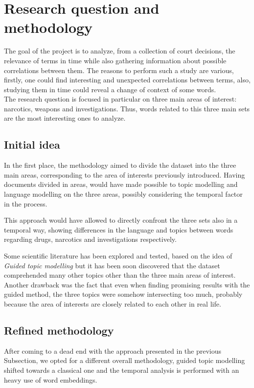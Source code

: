 \section{Research question and methodology}

The goal of the project is to analyze, from a collection 
of court decisions, the relevance of terms in time while 
also gathering information about possible correlations between 
them. The reasons to perform such a study are various, firstly, 
one could find interesting and unexpected correlations between terms, 
also, studying them in time could reveal a change of 
context of some words.\\
The research question is focused in particular on three main areas of interest:
narcotics, weapons and investigations. Thus, words related to this three main sets
are the most interesting ones to analyze.

\subsection{Initial idea}
\label{res-med}
In the first place, the methodology aimed to divide the dataset into the three main areas, 
corresponding to the area of interests previously introduced. 
Having documents divided in areas, would have made possible to topic modelling and language modelling on the three areas, possibly considering the temporal factor in the process. 

This approach would have allowed to directly confront the three sets also in a temporal way, showing differences in the language and topics between words regarding drugs, narcotics and investigations respectively.

Some scientific literature has been explored and tested, based on the idea of \emph{Guided topic modelling} 
but it has been soon discovered that the dataset comprehended many other topics other than the
three main areas of interest.~\cite{glda} Another drawback was the fact that even when finding promising results 
with the guided method, the three topics were somehow intersecting too much, probably because the 
area of interests are closely related to each other in real life.

\subsection{Refined methodology}

After coming to a dead end with the approach presented in the previous Subsection, we opted for a different
overall methodology, guided topic modelling shifted towards a classical one and the temporal 
analysis is performed with an heavy use of word embeddings.  